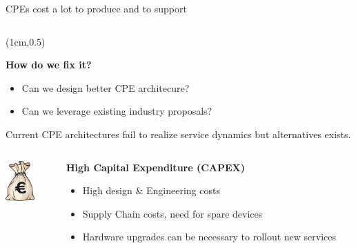 \documentclass[a4paper]{beamer}
\begin{document}
\begin{frame}{CPEs cost a lot to produce and to support}
\begin{columns}[T]
\begin{column}[T]{0.75 \textwidth}
									
		\end{column}
						
	\end{columns}
	

\begin{textblock*}{10cm}(1cm,0.5\textheight)
\begin{alertblock}{}
\textbf{  How do we fix it? }
  \begin{itemize}
    \item Can we design better CPE architecure?
    \item Can we leverage existing industry proposals?
  \end{itemize}
\end{alertblock}
\end{textblock*}
	
\end{frame}

\begin{frame}{Current CPE architectures fail to realize service dynamics but alternatives exists.}

\begin{columns}[T] 
		\begin{column}[T]{0.15 \textwidth} 
			\includegraphics[width=3em]{bagofmoney.jpg}
		\end{column}
						
		\begin{column}[T]{0.75 \textwidth} 
									
										   
			\textbf{ High Capital Expenditure (CAPEX)}
			\begin{itemize}
				\item High design \& Engineering costs
				\item Supply Chain costs, need for spare devices
				\item Hardware upgrades can be necessary to rollout new services
			\end{itemize}
						\vspace{3em}				     
									
		\end{column}
						
	\end{columns}

	
\end{frame}
\end{document}

